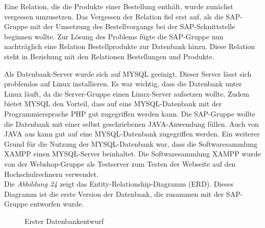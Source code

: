 Eine Relation, die die Produkte einer Bestellung enthält, wurde zunächst vergessen umzusetzen. Das Vergessen der Relation fiel erst auf, als die SAP-Gruppe mit der Umsetzung des Bestellvorgangs bei der SAP-Schnittstelle beginnen wollte. Zur Lösung des Problems fügte die SAP-Gruppe nun nachträglich eine Relation \glqq Bestellprodukte\grqq{} zur Datenbank hinzu. Diese Relation steht in Beziehung mit den Relationen \glqq Bestellungen\grqq{} und \glqq Produkte\grqq{}.

Als Datenbank-Server wurde sich auf MYSQL geeinigt. Dieser Server lässt sich problemlos auf Linux installieren. Es war wichtig, dass die Datenbank unter Linux läuft, da die Server-Gruppe einen Linux-Server aufsetzen wollte. Zudem bietet MYSQL den Vorteil, dass auf eine MYSQL-Datenbank mit der Programmiersprache PHP gut zugegriffen werden kann. Die SAP-Gruppe wollte die Datenbank mit einer selbst geschriebenen JAVA-Anwendung füllen. Auch von JAVA aus kann gut auf eine MYSQL-Datenbank zugegriffen werden. Ein weiterer Grund für die Nutzung der MYSQL-Datenbank war, dass die Softwaresammlung XAMPP einen MYSQL-Server beinhaltet. Die Softwaresammlung XAMPP wurde von der Webshop-Gruppe als Testserver zum Testen der Webseite auf den Hochschulrechnern verwendet. \\
Die \textit{Abbildung 24} zeigt das \glqq Entity-Relationship-Diagramm (ERD)\grqq{}. Dieses Diagramm ist die erste Version der Datenbank, die zusammen mit der SAP-Gruppe entworfen wurde. 

\begin{figure}[H]
	\begin{center}
	\end{center}
	\caption{Erster Datenbankentwurf}
\end{figure}

